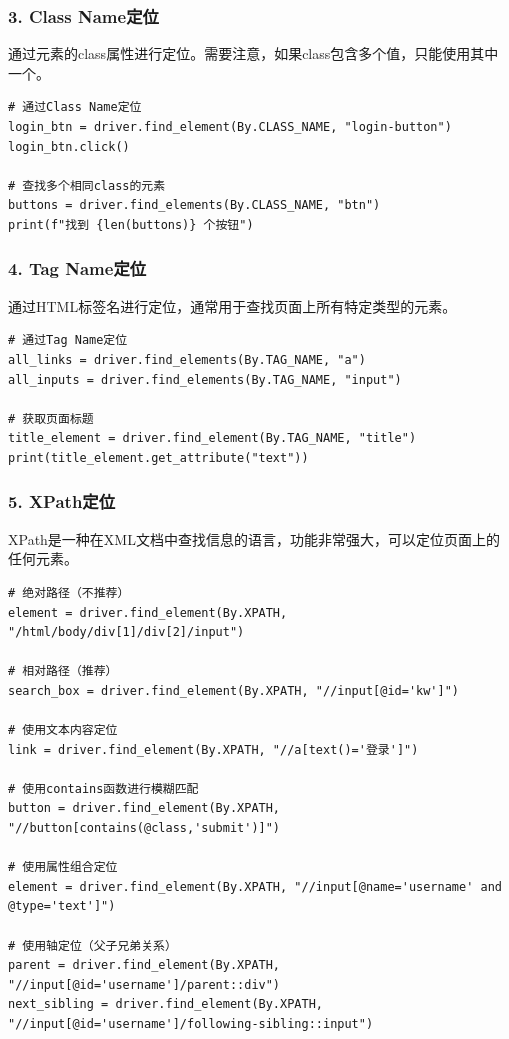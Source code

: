 \subsubsection{3. Class Name定位}
通过元素的class属性进行定位。需要注意，如果class包含多个值，只能使用其中一个。

\begin{lstlisting}[style=demostyle,numbers=none]
# 通过Class Name定位
login_btn = driver.find_element(By.CLASS_NAME, "login-button")
login_btn.click()

# 查找多个相同class的元素
buttons = driver.find_elements(By.CLASS_NAME, "btn")
print(f"找到 {len(buttons)} 个按钮")
\end{lstlisting}

\subsubsection{4. Tag Name定位}
通过HTML标签名进行定位，通常用于查找页面上所有特定类型的元素。

\begin{lstlisting}[style=demostyle,numbers=none]
# 通过Tag Name定位
all_links = driver.find_elements(By.TAG_NAME, "a")
all_inputs = driver.find_elements(By.TAG_NAME, "input")

# 获取页面标题
title_element = driver.find_element(By.TAG_NAME, "title")
print(title_element.get_attribute("text"))
\end{lstlisting}

\subsubsection{5. XPath定位}
XPath是一种在XML文档中查找信息的语言，功能非常强大，可以定位页面上的任何元素。

\begin{lstlisting}[style=demostyle,numbers=none]
# 绝对路径（不推荐）
element = driver.find_element(By.XPATH, "/html/body/div[1]/div[2]/input")

# 相对路径（推荐）
search_box = driver.find_element(By.XPATH, "//input[@id='kw']")

# 使用文本内容定位
link = driver.find_element(By.XPATH, "//a[text()='登录']")

# 使用contains函数进行模糊匹配
button = driver.find_element(By.XPATH, "//button[contains(@class,'submit')]")

# 使用属性组合定位
element = driver.find_element(By.XPATH, "//input[@name='username' and @type='text']")

# 使用轴定位（父子兄弟关系）
parent = driver.find_element(By.XPATH, "//input[@id='username']/parent::div")
next_sibling = driver.find_element(By.XPATH, "//input[@id='username']/following-sibling::input")
\end{lstlisting}

